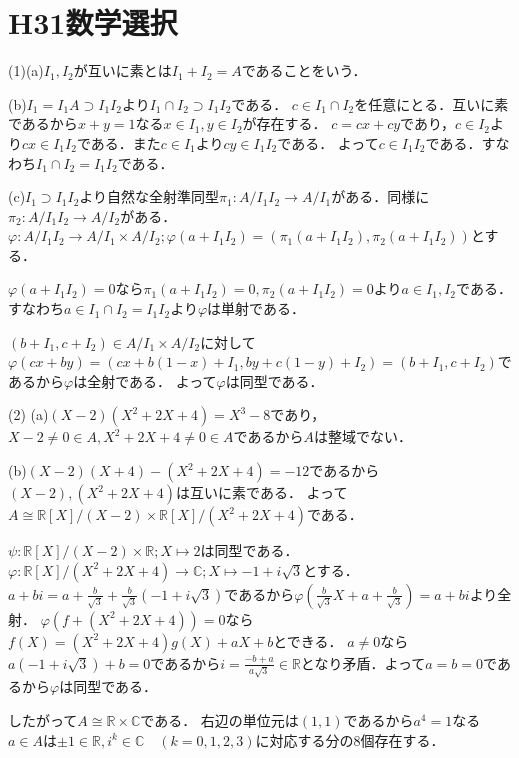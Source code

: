 \documentclass[
		book,
		head_space=20mm,
		foot_space=20mm,
		gutter=10mm,
		line_length=190mm
]{jlreq}
\begin{document}
\section{H31数学選択}
(1)(a)$I_1,I_2$が互いに素とは$I_1+I_2=A$であることをいう．

(b)$I_1=I_1A\supset I_1I_2$より$I_1\cap I_2\supset I_1I_2$である．
$c\in I_1\cap I_2$を任意にとる．互いに素であるから$x+y=1$なる$x\in I_1,y\in I_2$が存在する．
$c=cx+cy$であり，$c\in I_2$より$cx\in I_1I_2$である．また$c\in I_1$より$cy\in I_1I_2$である．
よって$c\in I_1I_2$である．すなわち$I_1\cap I_2=I_1I_2$である．

(c)$I_1\supset I_1I_2$より自然な全射準同型$\pi_1 \colon A/I_1I_2\rightarrow A/I_1$がある．同様に$\pi_2 \colon A/I_1I_2\rightarrow A/I_2$がある．
$\varphi\colon A/I_1I_2\rightarrow A/I_1\times A/I_2;\varphi(a+I_1I_2)=(\pi_1(a+I_1I_2),\pi_2(a+I_1I_2))$とする．

$\varphi(a+I_1I_2)=0$なら$\pi_1(a+I_1I_2)=0,\pi_2(a+I_1I_2)=0$より$a\in I_1,I_2$である．すなわち$a\in I_1\cap I_2=I_1I_2$より$\varphi$は単射である．

$(b+I_1,c+I_2)\in A/I_1\times A/I_2$に対して
$\varphi(cx+by)=(cx+b(1-x)+I_1,by+c(1-y)+I_2)=(b+I_1,c+I_2)$であるから$\varphi$は全射である．
よって$\varphi$は同型である．

(2)
(a)$(X-2)(X^2+2X+4)=X^3-8$であり，$X-2\neq 0\in A,X^2+2X+4\neq 0\in A$であるから$A$は整域でない．

(b)$(X-2)(X+4)-(X^2+2X+4)=-12$であるから$(X-2),(X^2+2X+4)$は互いに素である．
よって$A\cong \mathbb{R}[X]/(X-2)\times \mathbb{R}[X]/(X^2+2X+4)$である．

$\psi\colon \mathbb{R}[X]/(X-2)\times \mathbb{R};X\mapsto 2$は同型である．
$\varphi\colon \mathbb{R}[X]/(X^2+2X+4)\rightarrow \mathbb{C};X\mapsto -1+i\sqrt{3}$とする．
$a+bi=a+\frac{b}{\sqrt{3}}+\frac{b}{\sqrt{3}}(-1+i\sqrt{3})$であるから$\varphi(\frac{b}{\sqrt{3}}X+a+\frac{b}{\sqrt{3}})=a+bi$より全射．
$\varphi(f+(X^2+2X+4))=0$なら$f(X)=(X^2+2X+4)g(X)+aX+b$とできる．
$a\neq 0$なら$a(-1+i\sqrt{3})+b=0$であるから$i=\frac{-b+a}{a\sqrt{3}}\in \mathbb{R}$となり矛盾．よって$a=b=0$であるから$\varphi$は同型である．

したがって$A\cong \mathbb{R} \times \mathbb{C}$である．
右辺の単位元は$(1,1)$であるから$a^4=1$なる$a\in A$は$\pm 1\in \mathbb{R},i^k\in \mathbb{C}\quad(k=0,1,2,3)$に対応する分の$8$個存在する．
\end{document}

